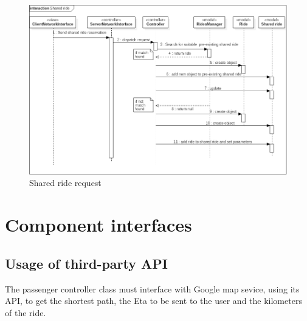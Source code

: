 \begin{figure} [h]
\centering
\includegraphics[scale=0.5]{Sequence Diagrams/MVC_Shared_ride.png}
\caption{Shared ride request }
\end{figure}


\section{Component interfaces}

\subsection{Usage of third-party API}
The passenger controller class must interface with Google map sevice, using its API, to get the shortest path, the Eta to be sent to the user and the 
kilometers of the ride.


